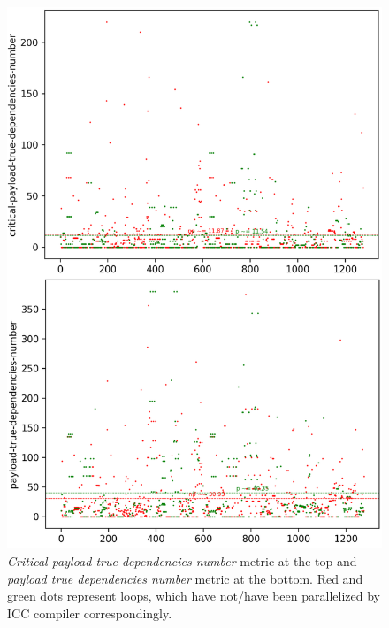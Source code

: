 \begin{figure}[h]
	\centering
	\includegraphics[width=\linewidth]{figs/loop-dependencies-number-1.png}
	\caption{\textit{Critical payload true dependencies number} metric at the top and \textit{payload true dependencies number} metric at the bottom. Red and green dots represent loops, which have not/have been parallelized by ICC compiler correspondingly.}
	\label{loop-dependencies-number-1}
\end{figure}

